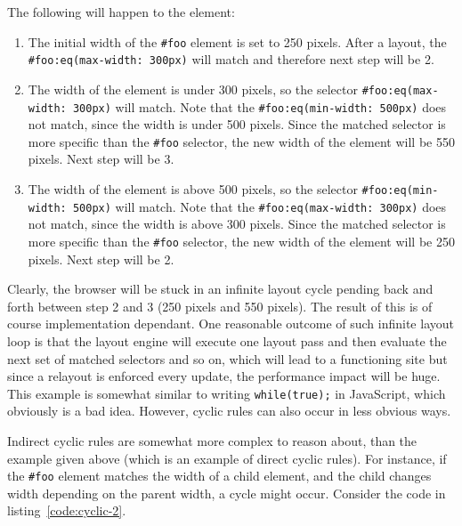 \documentclass[a4paper,11pt]{kth-mag}
\newcommand{\code}[1]{\texttt{#1}}
\begin{document}
          The following will happen to the element:
          \begin{enumerate}
          \item The initial width of the \code{\#foo} element is set to 250 pixels.
          After a layout, the \code{\#foo:eq(max-width: 300px)} will match and therefore next step will be 2.
          \item The width of the element is under 300 pixels, so the selector \code{\#foo:eq(max-width: 300px)} will match.
          Note that the \code{\#foo:eq(min-width: 500px)} does not match, since the width is under 500 pixels.
          Since the matched selector is more specific than the \code{\#foo} selector, the new width of the element will be 550 pixels.
          Next step will be 3.
          \item The width of the element is above 500 pixels, so the selector \code{\#foo:eq(min-width: 500px)} will match.
          Note that the \code{\#foo:eq(max-width: 300px)} does not match, since the width is above 300 pixels.
          Since the matched selector is more specific than the \code{\#foo} selector, the new width of the element will be 250 pixels.
          Next step will be 2.
          \end{enumerate}
          Clearly, the browser will be stuck in an infinite layout cycle pending back and forth between step 2 and 3 (250 pixels and 550 pixels).
          The result of this is of course implementation dependant.
          One reasonable outcome of such infinite layout loop is that the layout engine will execute one layout pass and then evaluate the next set of matched selectors and so on, which will lead to a functioning site but since a relayout is enforced every update, the performance impact will be huge.
          This example is somewhat similar to writing \code{while(true);} in JavaScript, which obviously is a bad idea.
          However, cyclic rules can also occur in less obvious ways. 

          Indirect cyclic rules are somewhat more complex to reason about, than the example given above (which is an example of direct cyclic rules).
          For instance, if the \code{\#foo} element matches the width of a child element, and the child changes width depending on the parent width, a cycle might occur.
          Consider the code in listing~\ref{code:cyclic-2}.
          
\end{document}
